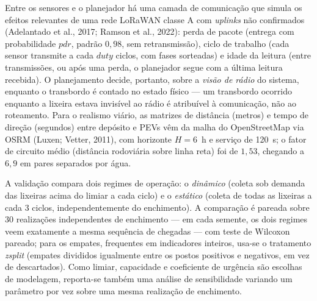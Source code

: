 \documentclass[10pt,a4paper]{article}
\begin{document}
\vspace{\baselineskip}
Entre os sensores e o planejador há uma camada de comunicação que simula os efeitos relevantes de uma rede LoRaWAN classe A com \textit{uplinks} não confirmados (Adelantado et al., 2017; Ramson et al., 2022): perda de pacote (entrega com probabilidade $\mathit{pdr}$, padrão $0{,}98$, sem retransmissão), ciclo de trabalho (cada sensor transmite a cada $\mathit{duty}$ ciclos, com fases sorteadas) e idade da leitura (entre transmissões, ou após uma perda, o planejador segue com a última leitura recebida). O planejamento decide, portanto, sobre a \emph{visão de rádio} do sistema, enquanto o transbordo é contado no estado físico --- um transbordo ocorrido enquanto a lixeira estava invisível ao rádio é atribuível à comunicação, não ao roteamento. Para o realismo viário, as matrizes de distância (metros) e tempo de direção (segundos) entre depósito e PEVs vêm da malha do OpenStreetMap via OSRM (Luxen; Vetter, 2011), com horizonte $H=6$~h e serviço de 120~s; o fator de circuito médio (distância rodoviária sobre linha reta) foi de $1{,}53$, chegando a $6{,}9$ em pares separados por água.

\vspace{\baselineskip}
A validação compara dois regimes de operação: o \emph{dinâmico} (coleta sob demanda das lixeiras acima do limiar a cada ciclo) e o \emph{estático} (coleta de todas as lixeiras a cada 3 ciclos, independentemente do enchimento). A comparação é pareada sobre 30 realizações independentes de enchimento --- em cada semente, os dois regimes veem exatamente a mesma sequência de chegadas --- com teste de Wilcoxon pareado; para os empates, frequentes em indicadores inteiros, usa-se o tratamento \textit{zsplit} (empates divididos igualmente entre os postos positivos e negativos, em vez de descartados). Como limiar, capacidade e coeficiente de urgência são escolhas de modelagem, reporta-se também uma análise de sensibilidade variando um parâmetro por vez sobre uma mesma realização de enchimento.

\end{document}
